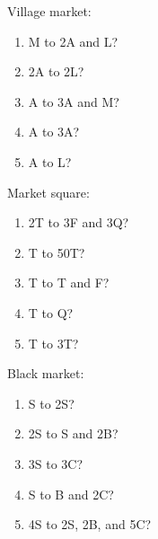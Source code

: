 {\normalfont\wedn
Village market:

\begin{enumerate}
\item M to 2A and L?
\item 2A to 2L?
\item A to 3A and M?
\item A to 3A?
\item A to L?
\end{enumerate}

Market square:

\begin{enumerate}
\item 2T to 3F and 3Q?
\item T to 50T?
\item T to T and F?
\item T to Q?
\item T to 3T?
\end{enumerate}

Black market:

\begin{enumerate}
\item S to 2S?
\item 2S to S and 2B?
\item 3S to 3C?
\item S to B and 2C?
\item 4S to 2S, 2B, and 5C?
\end{enumerate}
}

%
